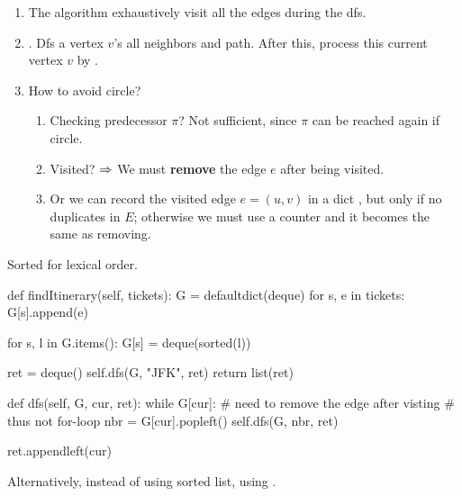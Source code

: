 \begin{enumerate}
\item The algorithm exhaustively visit all the edges during the dfs. 
\item {}. Dfs a vertex $v$'s all neighbors and path. After this, process  this current vertex $v$ by . 
\item How to avoid circle?
\begin{enumerate}
\item Checking predecessor $\pi$? Not sufficient, since $\pi$ can be reached again if circle. 
\item Visited? $\Rightarrow$ We must \textbf{remove} the edge $e$ after being visited. 
\item Or we can record the visited edge $e=(u,v)$ in a dict , but only if no duplicates in $E$; otherwise we must use a counter and it becomes the same as removing.
\end{enumerate}
\end{enumerate}
\begin{center}
\end{center}

Sorted for lexical order. 
\begin{python}
def findItinerary(self, tickets):
    G = defaultdict(deque)
    for s, e in tickets:
        G[s].append(e)
    
    for s, l in G.items():
        G[s] = deque(sorted(l))
    
    ret = deque()
    self.dfs(G, "JFK", ret)
    return list(ret)

def dfs(self, G, cur, ret):
    while G[cur]:
        # need to remove the edge after visting
      	# thus not for-loop
        nbr = G[cur].popleft()
        self.dfs(G, nbr, ret)
    
    ret.appendleft(cur)
\end{python}

Alternatively, instead of using sorted list, using .

